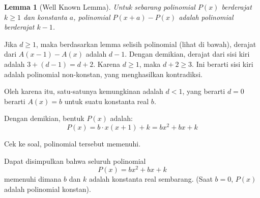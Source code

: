 \documentclass[12pt]{article}
\theoremstyle{mystyle}
\newtheorem{lemma}{Lemma}
\begin{document}
\begin{lemma}[Well Known Lemma]
Untuk sebarang polinomial $P(x)$ berderajat $k \ge 1$ dan konstanta $a$, polinomial $P(x+a)-P(x)$ adalah polinomial berderajat $k-1$.
\end{lemma}

Jika $d \ge 1$, maka berdasarkan lemma selisih polinomial (lihat di bawah), derajat dari $A(x-1)-A(x)$ adalah $d-1$. Dengan demikian, derajat dari sisi kiri adalah $3 + (d-1) = d+2$. Karena $d \ge 1$, maka $d+2 \ge 3$. Ini berarti sisi kiri adalah polinomial non-konstan, yang menghasilkan kontradiksi.
 
Oleh karena itu, satu-satunya kemungkinan adalah $d < 1$, yang berarti $d=0$ berarti $A(x)=b$ untuk suatu konstanta real $b$.

Dengan demikian, bentuk $P(x)$ adalah:
\[ P(x) = b \cdot x(x+1) + k = bx^2 + bx + k \]

Cek ke soal, polinomial tersebut memenuhi.

Dapat disimpulkan bahwa seluruh polinomial
\[ P(x) = bx^2 + bx + k \]
memenuhi dimana $b$ dan $k$ adalah konstanta real sembarang. (Saat $b=0$, $P(x)$ adalah polinomial konstan).
\end{document}
